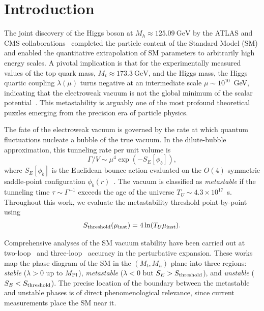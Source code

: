 \documentclass[aps,prd,twocolumn,superscriptaddress,nofootinbib]{revtex4-2}
\begin{document}
\section{Introduction}
\label{sec:intro}

The joint discovery of the Higgs boson at $M_h \approx 125.09~\text{GeV}$
by the ATLAS and CMS collaborations~\cite{Aad:2012tfa,Chatrchyan:2012xdj}
completed the particle content of the Standard Model (SM) and enabled the
quantitative extrapolation of SM parameters to arbitrarily high energy
scales. A pivotal implication is that for the experimentally
measured values of the top quark mass, $M_t \approx 173.3~\text{GeV}$, and
the Higgs mass, the Higgs quartic coupling $\lambda(\mu)$ turns negative
at an intermediate scale $\mu \sim 10^{10}$~GeV, indicating that the
electroweak vacuum is not the global minimum of the scalar
potential~\cite{Degrassi:2012ry,Buttazzo:2013uya}. This metastability
is arguably one of the most profound theoretical puzzles emerging from
the precision era of particle physics.

The fate of the electroweak vacuum is governed by the rate at which quantum
fluctuations nucleate a bubble of the true vacuum. In the dilute-bubble
approximation, this tunneling rate per unit volume is
\begin{equation}
    \Gamma/V \sim \mu^4 \exp(-S_E[\phi_b]),
    \label{eq:tunneling_rate}
\end{equation}
where $S_E[\phi_b]$ is the Euclidean bounce action evaluated on the $O(4)$-symmetric saddle-point configuration $\phi_b(r)$~\cite{Coleman:1977py,Callan:1977pt}. The vacuum is classified as \textit{metastable} if the tunneling time $\tau \sim \Gamma^{-1}$ exceeds the age of the universe $T_U \sim 4.3 \times 10^{17}$~s. Throughout this work, we evaluate the metastability threshold point-by-point using~\cite{Buttazzo:2013uya}
\begin{equation}
    S_{\rm threshold}(\mu_{\rm inst}) = 4\ln(T_U\mu_{\rm inst}).
    \label{eq:threshold}
\end{equation}

Comprehensive analyses of the SM vacuum stability have been carried out at
two-loop~\cite{Isidori:2001bm,Espinosa:2007qp} and
three-loop~\cite{Degrassi:2012ry,Buttazzo:2013uya,Bezrukov:2012sa}
accuracy in the perturbative expansion. These works map the phase diagram of
the SM in the $(M_t, M_h)$ plane into three regions: \textit{stable}
($\lambda > 0$ up to $M_{\rm Pl}$), \textit{metastable} ($\lambda < 0$ but
$S_E > S_{\rm threshold}$), and \textit{unstable} ($S_E < S_{\rm threshold}$).
The precise location of the boundary between the metastable and unstable
phases is of direct phenomenological relevance, since current measurements
place the SM near it.
\end{document}
